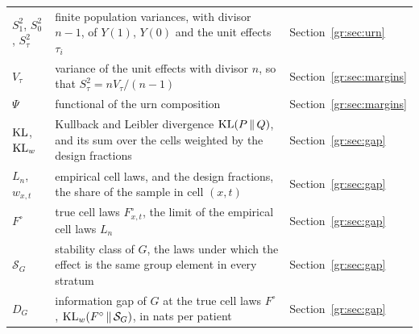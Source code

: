 {\noindent\small\centering
\setlength{\tabcolsep}{4pt}\renewcommand{\arraystretch}{1.1}
\begin{tabular}{>{\raggedright\arraybackslash}p{1.0in}>{\raggedright\arraybackslash}p{2.15in}>{\raggedright\arraybackslash}p{0.95in}}
$S_1^2$, $S_0^2$, $S_\tau^2$ & finite population variances, with divisor $n - 1$, of $Y(1)$, $Y(0)$ and the unit effects $\tau_i$ & Section~\ref{gr:sec:urn} \\
$V_\tau$ & variance of the unit effects with divisor $n$, so that $S_\tau^2 = nV_\tau/(n - 1)$ & Section~\ref{gr:sec:margins} \\
$\Psi$ & functional of the urn composition & Section~\ref{gr:sec:margins} \\
$\mathrm{KL}$, $\mathrm{KL}_w$ & Kullback and Leibler divergence $\mathrm{KL}(P \,\|\, Q)$, and its sum over the cells weighted by the design fractions & Section~\ref{gr:sec:gap} \\
$L_n$, $w_{x,t}$ & empirical cell laws, and the design fractions, the share of the sample in cell $(x, t)$ & Section~\ref{gr:sec:gap} \\
$F^{\circ}$ & true cell laws $F^{\circ}_{x,t}$, the limit of the empirical cell laws $L_n$ & Section~\ref{gr:sec:gap} \\
$\mathcal S_G$ & stability class of $G$, the laws under which the effect is the same group element in every stratum & Section~\ref{gr:sec:gap} \\
$D_G$ & information gap of $G$ at the true cell laws $F^{\circ}$, $\mathrm{KL}_w(F^{\circ} \,\|\, \mathcal S_G)$, in nats per patient & Section~\ref{gr:sec:gap} \\
\end{tabular}\par}

